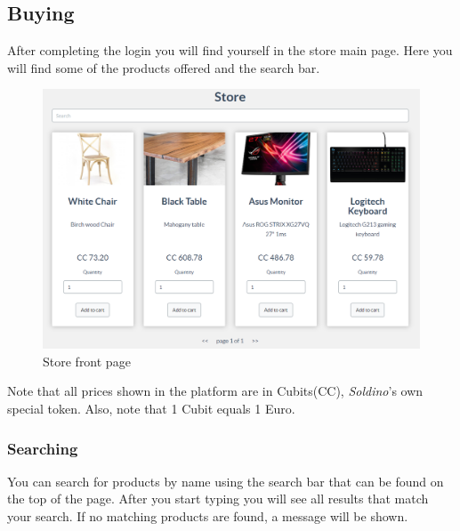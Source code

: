 	\subsection{Buying}
	After completing the login you will find yourself in the store main page. 
	Here you will find some of the products offered and the search bar.
	\begin{figure}[H]
		\includegraphics[width=15cm]{res/images/store_main_page.png}
		\centering
		\caption{Store front page}
	\end{figure}
	\noindent Note that all prices shown in the platform are in Cubits\glosp (CC\glo), 
	\textit{Soldino}'s own special token. Also, note that 1 Cubit equals 1 Euro.
		\subsubsection{Searching}
		You can search for products by name using the search bar that can be found 
		on the top of the page. After you start typing you will 
		see all results that match your search. If no matching products are 
		found, a message will be shown.
%		
